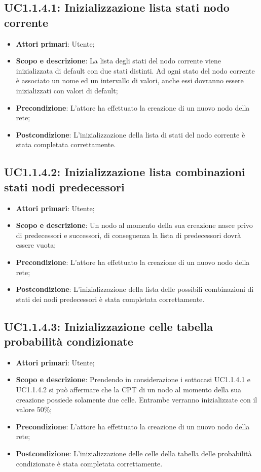 \subsection{UC1.1.4.1: Inizializzazione lista stati nodo corrente} 
\begin{itemize} 
	\item{\textbf{Attori primari}: Utente;} 
	\item{\textbf{Scopo e descrizione}: La lista degli stati del nodo corrente viene inizializzata di default con due stati distinti. Ad ogni stato del nodo corrente è associato un nome ed un intervallo di valori, anche essi dovranno essere inizializzati con valori di default;} 
	\item{\textbf{Precondizione}: L'attore ha effettuato la creazione di un nuovo nodo della rete;} 
	\item{\textbf{Postcondizione}: L'inizializzazione della lista di stati del nodo corrente è stata completata correttamente.} 
\end{itemize} 
\subsection{UC1.1.4.2: Inizializzazione lista combinazioni stati nodi predecessori} 
\begin{itemize} 
	\item{\textbf{Attori primari}: Utente;} 
	\item{\textbf{Scopo e descrizione}: Un nodo al momento della sua creazione nasce privo di predecessori e successori, di conseguenza la lista di predecessori dovrà essere vuota;} 
	\item{\textbf{Precondizione}: L'attore ha effettuato la creazione di un nuovo nodo della rete;} 
	\item{\textbf{Postcondizione}: L'inizializzazione della lista delle possibili combinazioni di stati dei nodi predecessori è stata completata correttamente.} 
\end{itemize} 
\subsection{UC1.1.4.3: Inizializzazione celle tabella probabilità condizionate} 
\begin{itemize} 
	\item{\textbf{Attori primari}: Utente;} 
	\item{\textbf{Scopo e descrizione}: Prendendo in considerazione i sottocasi UC1.1.4.1 e UC1.1.4.2 si può affermare che la CPT di un nodo al momento della sua creazione possiede solamente due celle. Entrambe verranno inizializzate con il valore 50\%;} 
	\item{\textbf{Precondizione}: L'attore ha effettuato la creazione di un nuovo nodo della rete;} 
	\item{\textbf{Postcondizione}: L'inizializzazione delle celle della tabella delle probabilità condizionate è stata completata correttamente.} 
\end{itemize} 
